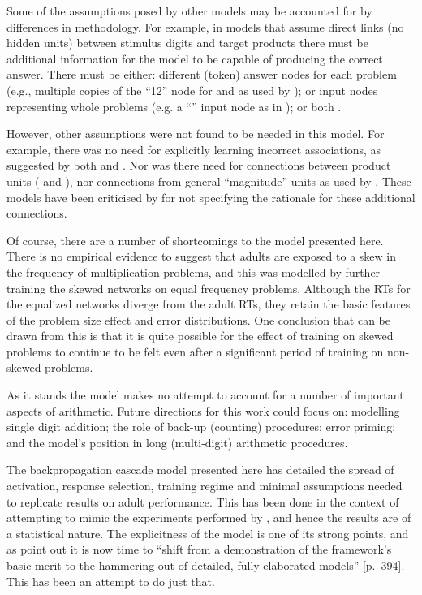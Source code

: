 Some of the assumptions posed by other models may be accounted for by
differences in methodology.  For example, in models that assume direct
links (no hidden units) between stimulus digits and target products there
must be additional information for the model to be capable of producing the
correct answer.  There must be either: different (token) answer nodes for
each problem (e.g., multiple copies of the ``12'' node for  and  as
used by ); or input nodes representing whole problems (e.g.
a ``'' input node as in ); or both \cite{siegmult}.

However, other assumptions were not found to be needed in this model.  For
example, there was no need for explicitly learning incorrect associations,
as suggested by both  and .  Nor was there
need for connections between product units ( and
), nor connections from general ``magnitude'' units as used
by .   These models have been criticised by 
for not specifying the rationale for these additional connections.

Of course, there are a number of shortcomings to the model presented here.
There is no empirical evidence to suggest
that adults are exposed to a skew in the frequency of
multiplication problems, and this was modelled by further training the
skewed networks on equal frequency problems.  Although the RTs for the
equalized networks diverge from the adult RTs, they retain the basic
features of the problem size effect and error distributions.  One
conclusion that can be drawn from this is that it is quite possible for the
effect of training on skewed problems to continue to be felt even after a
significant period of training on non-skewed problems.

As it stands the model makes no attempt to account for a number of
important aspects of arithmetic. Future
directions for this work could focus on: modelling single digit addition;
the
role of back-up (counting) procedures; error priming; and the model's
position in long (multi-digit) arithmetic procedures.

The backpropagation cascade model presented here has detailed the spread of
activation, response selection, training regime and minimal assumptions
needed to replicate results on adult performance.  This has been done in
the context of attempting to mimic the experiments performed by
, and hence the results are of a statistical nature.  The
explicitness of the model is one of its strong points, and as
 point out it is now time to ``shift from a
demonstration of the framework's basic merit to the hammering out of
detailed, fully elaborated models'' [p.~394].  This has been an attempt to
do just that.



